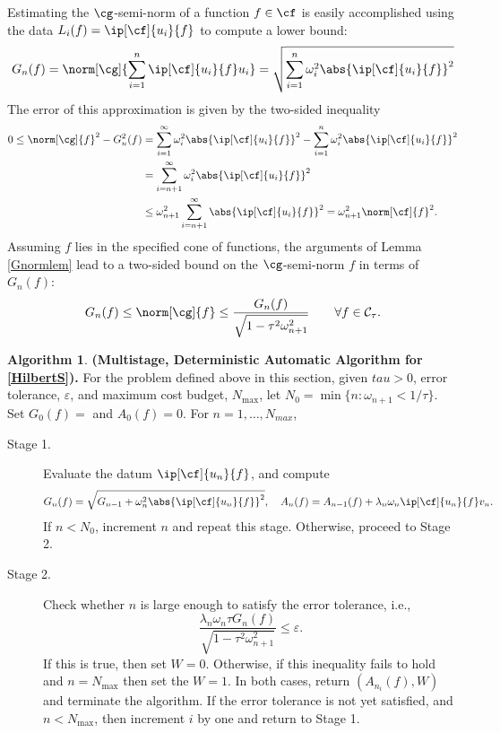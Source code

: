 \documentclass[final]{elsarticle}
\newcommand{\cc}{\mathcal{C}}
\theoremstyle{definition}
\newtheorem{algo}{Algorithm}
\theoremstyle{remark}
\begin{document}
Estimating the $\cg$-semi-norm of a function $f \in \cf$ is easily accomplished using the data $L_i(f)=\ip[\cf]{u_i}{f}$ to compute a lower bound:
\begin{equation} \label{genLGalg}
G_n(f) = \norm[\cg]{\sum_{i=1}^n \ip[\cf]{u_i}{f} u_i } = \sqrt{\sum_{i=1}^n \omega_i^2\abs{\ip[\cf]{u_i}{f}}^2 }
\end{equation}
The error of this approximation is given by the two-sided inequality
\begin{align*}
0 \le \norm[\cg]{f}^2 - G_n^2(f) 
&= \sum_{i=1}^\infty \omega_i^2\abs{\ip[\cf]{u_i}{f}}^2 -  \sum_{i=1}^n \omega_i^2\abs{\ip[\cf]{u_i}{f}}^2\\
& = \sum_{i=n+1}^\infty \omega_i^2\abs{\ip[\cf]{u_i}{f}}^2 \\
& \le \omega_{n+1}^2 \sum_{i=n+1}^\infty \abs{\ip[\cf]{u_i}{f}}^2 = \omega_{n+1}^2 \norm[\cf]{f}^2.
\end{align*}
Assuming $f$ lies in the specified cone of functions, the arguments of Lemma \ref{Gnormlem} lead to a two-sided bound on the $\cg$-semi-norm $f$ in terms of $G_n(f)$:
\[
G_n(f)  \le \norm[\cg]{f} \le \frac{G_n(f)}{\sqrt{1 - \tau^2 \omega_{n+1}^2}} \qquad \forall f \in \cc_{\tau}.
\]

\begin{algo} \label{GenHilbAlg} {\bf (Multistage, Deterministic Automatic Algorithm for \eqref{HilbertS}).}  For the problem defined above in this section, given $tau>0$, error tolerance, $\varepsilon$, and maximum cost budget, $N_{\max}$, let $N_0= \min\{ n : \omega_{n+1} < 1 /\tau\}$. Set $G_0(f)=$ and $A_0(f)=0$.  For $n=1, \ldots, N_{max}$,

\begin{description}

\item [Stage 1.] Evaluate the datum $\ip[\cf]{u_n}{f}$, and compute  
\[
G_{n}(f)=\sqrt{G_{n-1} + \omega_n^2 \abs{\ip[\cf]{u_n}{f}}^2}, \quad A_n(f)=A_{n-1}(f)+ \lambda_n\omega_n\ip[\cf]{u_n}{f}v_n.
\]
If $n<N_0$, increment $n$ and repeat this stage.  Otherwise, proceed to Stage 2.

\item [Stage 2.] Check whether $n$ is large enough to satisfy the error tolerance, i.e., 
\[
\frac{\lambda_n \omega_n \tau G_{n}(f)}{\sqrt{1 - \tau^2 \omega_{n+1}^2}} \le \varepsilon.
\]
If this is true, then set $W=0$.  Otherwise, if this inequality fails to hold and $n= N_{\max}$ then set the $W=1$.  In both cases, return $(A_{n_i}(f),W)$ and terminate the algorithm.  If the error tolerance is not yet satisfied, and $n < N_{\max}$, then increment $i$ by one and return to Stage 1.
\end{description}
\end{algo}
\end{document}
